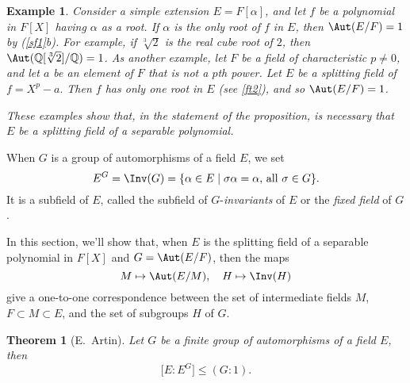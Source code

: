 \documentclass[a4paper,11pt,final,openany]{memoir}
\newtheorem{theorem}[X]{Theorem}
\newtheorem{example}[X]{Example}
\theoremstyle{nonumberplain}
\begin{document}
\begin{example}
\label{ft9}Consider a simple extension $E=F[\alpha]$, and let $f$ be a
polynomial in $F[X]$ having $\alpha$ as a root. If $\alpha$ is the only root
of $f$ in $E$, then $\Aut(E/F)=1$ by (\ref{sf1}b). For example, if
$\sqrt[3]{2}$ is the real cube root of $2$, then $\Aut(\mathbb{Q}[\sqrt[3]%
{2}]/\mathbb{Q})=1$. As another example, let $F$ be a field of characteristic
$p\neq0$, and let $a$ be an element of $F$ that is not a $p$th power. Let $E$
be a splitting field of $f=X^{p}-a.$ Then $f$ has only one root in $E$ (see
\ref{ft2}), and so $\Aut(E/F)=1$.

These examples show that, in the statement of the proposition, is necessary
that $E$ be a \textit{splitting} field of a \textit{separable}\emph{ }polynomial.
\end{example}

When $G$ is a group of automorphisms of a field $E$, we set
\[
E^{G}=\Inv(G)=\{\alpha\in E\mid\sigma\alpha=\alpha\text{, all }\sigma\in G\}.
\]
It is a subfield of $E$, called the subfield of $G$-\emph{invariants\/}%
of $E$ or the \emph{fixed field }%
%
of $G$.

In this section, we'll show that, when $E$ is the splitting field of a
separable polynomial in $F[X]$ and $G=\Aut(E/F)$, then the maps
\[
M\mapsto\Aut(E/M),\quad H\mapsto\Inv(H)
\]
give a one-to-one correspondence between the set of intermediate fields $M$,
$F\subset M\subset E$, and the set of subgroups $H$ of $G$.

\begin{theorem}
[E.~Artin]\label{ft10}%
%
Let $G$ be a finite group of automorphisms of a field $E$, then
\[
\lbrack E\colon E^{G}]\leq(G\colon1).
\]

\end{theorem}
\end{document}
